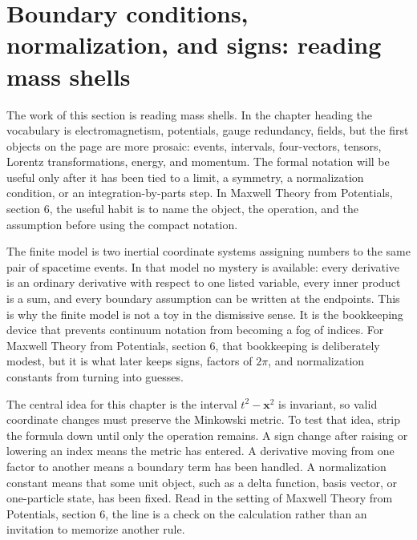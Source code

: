 \section{Boundary conditions, normalization, and signs: reading mass shells}













The work of this section is reading mass shells.  In the chapter heading the vocabulary is electromagnetism, potentials, gauge redundancy, fields, but the first objects on the page are more prosaic: events, intervals, four-vectors, tensors, Lorentz transformations, energy, and momentum.  The formal notation will be useful only after it has been tied to a limit, a symmetry, a normalization condition, or an integration-by-parts step.  In Maxwell Theory from Potentials, section 6, the useful habit is to name the object, the operation, and the assumption before using the compact notation.

The finite model is two inertial coordinate systems assigning numbers to the same pair of spacetime events.  In that model no mystery is available: every derivative is an ordinary derivative with respect to one listed variable, every inner product is a sum, and every boundary assumption can be written at the endpoints.  This is why the finite model is not a toy in the dismissive sense.  It is the bookkeeping device that prevents continuum notation from becoming a fog of indices.  For Maxwell Theory from Potentials, section 6, that bookkeeping is deliberately modest, but it is what later keeps signs, factors of \(2\pi\), and normalization constants from turning into guesses.

The central idea for this chapter is the interval \(t^2-\bm x^2\) is invariant, so valid coordinate changes must preserve the Minkowski metric.  To test that idea, strip the formula down until only the operation remains.  A sign change after raising or lowering an index means the metric has entered.  A derivative moving from one factor to another means a boundary term has been handled.  A normalization constant means that some unit object, such as a delta function, basis vector, or one-particle state, has been fixed.  Read in the setting of Maxwell Theory from Potentials, section 6, the line is a check on the calculation rather than an invitation to memorize another rule.

